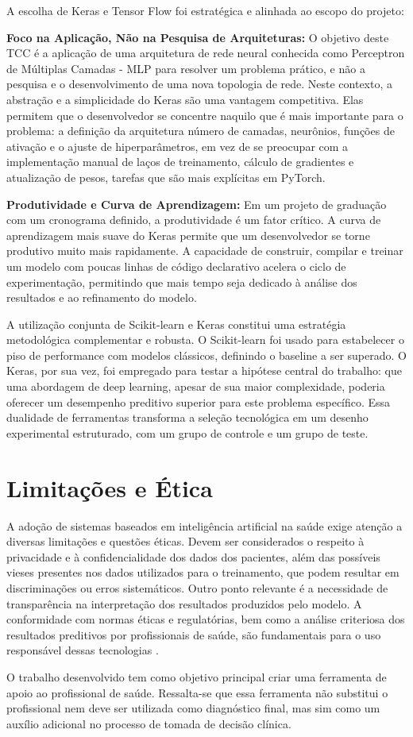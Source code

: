 A escolha de Keras e Tensor Flow foi estratégica e alinhada ao escopo do projeto:

\textbf{Foco na Aplicação, Não na Pesquisa de Arquiteturas:} O objetivo deste TCC é a aplicação de uma arquitetura de rede neural conhecida como Perceptron de Múltiplas Camadas - MLP para resolver um problema prático, e não a pesquisa e o desenvolvimento de uma nova topologia de rede. Neste contexto, a abstração e a simplicidade do Keras são uma vantagem competitiva. Elas permitem que o desenvolvedor se concentre naquilo que é mais importante para o problema: a definição da arquitetura número de camadas, neurônios, funções de ativação e o ajuste de hiperparâmetros, em vez de se preocupar com a implementação manual de laços de treinamento, cálculo de gradientes e atualização de pesos, tarefas que são mais explícitas em PyTorch.

\textbf{Produtividade e Curva de Aprendizagem:} Em um projeto de graduação com um cronograma definido, a produtividade é um fator crítico. A curva de aprendizagem mais suave do Keras permite que um desenvolvedor se torne produtivo muito mais rapidamente. A capacidade de construir, compilar e treinar um modelo com poucas linhas de código declarativo acelera o ciclo de experimentação, permitindo que mais tempo seja dedicado à análise dos resultados e ao refinamento do modelo.

A utilização conjunta de Scikit-learn e Keras constitui uma estratégia metodológica complementar e robusta. O Scikit-learn foi usado para estabelecer o piso de performance com modelos clássicos, definindo o baseline a ser superado. O Keras, por sua vez, foi empregado para testar a hipótese central do trabalho: que uma abordagem de deep learning, apesar de sua maior complexidade, poderia oferecer um desempenho preditivo superior para este problema específico. Essa dualidade de ferramentas transforma a seleção tecnológica em um desenho experimental estruturado, com um grupo de controle e um grupo de teste.

\section{Limitações e Ética}
A adoção de sistemas baseados em inteligência artificial na saúde exige atenção a diversas limitações e questões éticas. Devem ser considerados o respeito à privacidade e à confidencialidade dos dados dos pacientes, além das possíveis vieses presentes nos dados utilizados para o treinamento, que podem resultar em discriminações ou erros sistemáticos. Outro ponto relevante é a necessidade de transparência na interpretação dos resultados produzidos pelo modelo. A conformidade com normas éticas e regulatórias, bem como a análise criteriosa dos resultados preditivos por profissionais de saúde, são fundamentais para o uso responsável dessas tecnologias \cite{BRASIL2022}.

O trabalho desenvolvido tem como objetivo principal criar uma ferramenta de apoio ao profissional de saúde. Ressalta-se que essa ferramenta não substitui o profissional nem deve ser utilizada como diagnóstico final, mas sim como um auxílio adicional no processo de tomada de decisão clínica.
